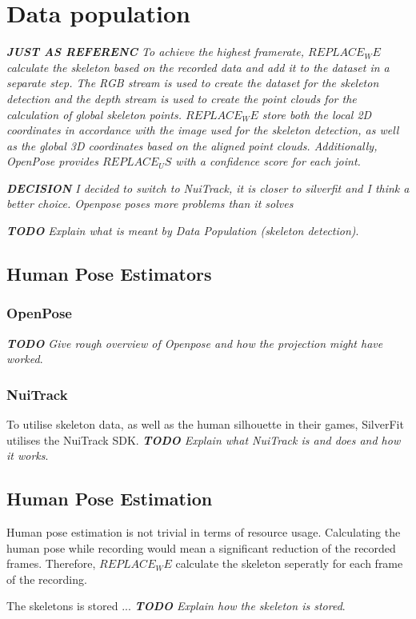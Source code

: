 \section{Data population}
\label{sec:data_population}

\textit{\textbf{JUST AS REFERENC} To achieve the highest framerate, $REPLACE_WE$ calculate the skeleton based on the recorded data and add it to the dataset in a separate step. The RGB stream is used to create the dataset for the skeleton detection and the depth stream is used to create the point clouds for the calculation of global skeleton points. $REPLACE_WE$ store both the local 2D coordinates in accordance with the image used for the skeleton detection, as well as the global 3D coordinates based on the aligned point clouds. Additionally, OpenPose provides $REPLACE_US$ with a confidence score for each joint.}

\textit{\textbf{DECISION} I decided to switch to NuiTrack, it is closer to silverfit and I think a better choice. Openpose poses more problems than it solves}

\textit{\textbf{TODO} Explain what is meant by Data Population (skeleton detection)}.

\subsection{Human Pose Estimators}

\subsubsection{OpenPose}

\textit{\textbf{TODO} Give rough overview of Openpose and how the projection might have worked}.

\subsubsection{NuiTrack}

To utilise skeleton data, as well as the human silhouette in their games, SilverFit utilises the NuiTrack SDK.  \textit{\textbf{TODO} Explain what NuiTrack is and does and how it works}.

\subsection{Human Pose Estimation}

Human pose estimation is not trivial in terms of resource usage. Calculating the human pose while recording would mean a significant reduction of the recorded frames. Therefore, $REPLACE_WE$ calculate the skeleton seperatly for each frame of the recording.

The skeletons is stored ... \textit{\textbf{TODO} Explain how the skeleton is stored}.